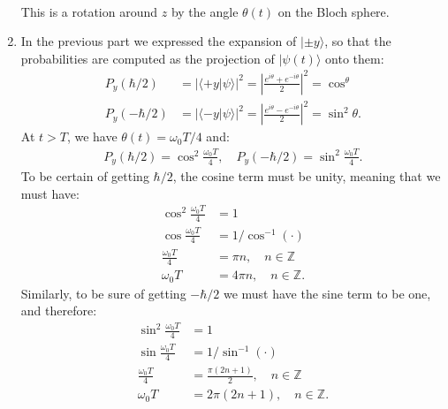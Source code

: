 \documentclass[letterpaper,11pt,twoside]{article}
\newcommand{\ket}[1]{|#1\rangle}
\newcommand{\braket}[1]{\langle#1\rangle}
\begin{document}
\begin{enumerate}[itemsep=0pt,topsep=0pt,label=\alph*)]
\begin{align*}
  \end{align*}
  This is a rotation around $z$ by the angle $\theta(t)$ on the Bloch sphere.
  \item In the previous part we expressed the expansion of $\ket{\pm y}$, so that the probabilities are computed as the projection of $\ket{\psi(t)}$ onto them:
  \begin{align*}
    P_y(\hbar/2)&=|\braket{+y|\psi}|^2=\left|\frac{e^{i\theta}+e^{-i\theta}}{2}\right|^2=\cos^\theta\\
    P_y(-\hbar/2)&=|\braket{-y|\psi}|^2=\left|\frac{e^{i\theta}-e^{-i\theta}}{2}\right|^2=\sin^2\theta.
  \end{align*}
  At $t>T$, we have $\theta(t)=\omega_0T/4$ and:
  \begin{align*}
    P_y(\hbar/2)=\cos^2\frac{\omega_0T}{4},\quad P_y(-\hbar/2)=\sin^2\frac{\omega_0T}{4}.
  \end{align*} 
  To be certain of getting $\hbar/2$, the cosine term must be unity, meaning that we must have:
  \begin{align*}
    \cos^2\frac{\omega_0T}{4}&=1\\
    \cos\frac{\omega_0T}{4}&=1/\cos^{-1}(\cdot)\\
    \frac{\omega_0T}{4}&=\pi n,\quad n\in\mathbb{Z}\\
    \omega_0T&=4\pi n,\quad n\in\mathbb{Z}.
  \end{align*}
  Similarly, to be sure of getting $-\hbar/2$ we must have the sine term to be one, and therefore:
  \begin{align*}
    \sin^2\frac{\omega_0T}{4}&=1\\
    \sin\frac{\omega_0T}{4}&=1/\sin^{-1}(\cdot)\\
    \frac{\omega_0T}{4}&=\frac{\pi(2n+1)}{2},\quad n\in\mathbb{Z}\\
    \omega_0T&=2\pi(2n+1),\quad n\in\mathbb{Z}.
  \end{align*}
\end{enumerate}



%
\end{document}
